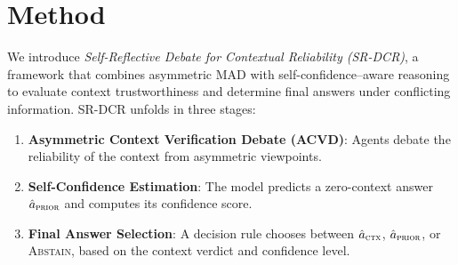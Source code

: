 \documentclass[11pt]{article}
\begin{document}

\section{Method}
We introduce \textit{Self-Reflective Debate for Contextual Reliability (SR-DCR)}, a framework that combines asymmetric MAD with self-confidence–aware reasoning to evaluate context trustworthiness and determine final answers under conflicting information. SR-DCR unfolds in three stages:
\begin{enumerate}[leftmargin=*, itemsep=2pt]
    \item \textbf{Asymmetric Context Verification Debate (ACVD)}: Agents debate the reliability of the context from asymmetric viewpoints.
    \item \textbf{Self-Confidence Estimation}: The model predicts a zero-context answer \(\hat{a}_{\textsc{prior}}\) and computes its confidence score.
    \item \textbf{Final Answer Selection}: A decision rule chooses between \(\hat{a}_{\textsc{ctx}}\), \(\hat{a}_{\textsc{prior}}\), or \textsc{Abstain}, based on the context verdict and confidence level.
\end{enumerate}
\end{document}
